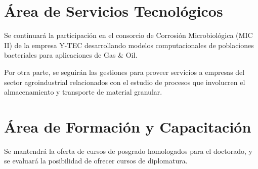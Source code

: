 \documentclass[a4paper,11pt,twoside,final,titlepage,onecolumn,openright]{report}
\begin{document}
\section{Área de Servicios Tecnológicos}
Se continuará la participación en el consorcio de Corrosión Microbiológica (MIC II) de la empresa Y-TEC desarrollando modelos computacionales de poblaciones bacteriales para aplicaciones de Gas \& Oil.

Por otra parte, se seguirán las gestiones para proveer servicios a empresas del sector agroindustrial relacionados con el estudio de procesos que involucren el almacenamiento y transporte de material granular.

\section{Área de Formación y Capacitación}

Se mantendrá la oferta de cursos de posgrado homologados para el doctorado, y se evaluará la posibilidad de ofrecer cursos de diplomatura.
\end{document}
